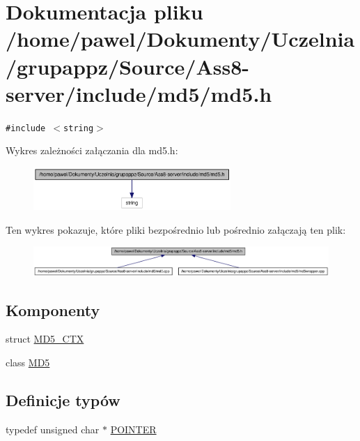 \hypertarget{a00010}{
\section{Dokumentacja pliku /home/pawel/Dokumenty/Uczelnia/grupappz/Source/Ass8-server/include/md5/md5.h}
\label{d7/dec/a00010}
}
{\tt \#include $<$string$>$}\par


Wykres zależności załączania dla md5.h:\nopagebreak
\begin{figure}[H]
\begin{center}
\leavevmode
\includegraphics[width=212pt]{db/d3a/a00040}
\end{center}
\end{figure}


Ten wykres pokazuje, które pliki bezpośrednio lub pośrednio załączają ten plik:\nopagebreak
\begin{figure}[H]
\begin{center}
\leavevmode
\includegraphics[width=420pt]{dd/d32/a00041}
\end{center}
\end{figure}
\subsection*{Komponenty}
\begin{CompactItemize}
\item 
struct \hyperlink{a00003}{MD5\_\-CTX}
\item 
class \hyperlink{a00002}{MD5}
\end{CompactItemize}
\subsection*{Definicje typów}
\begin{CompactItemize}
\item 
typedef unsigned char $\ast$ \hyperlink{a00010_73204e40637f83518fb695362ea084a4}{POINTER}
\end{CompactItemize}


